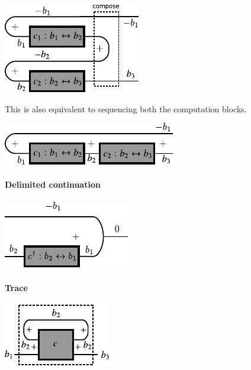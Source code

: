 \documentclass[preprint]{sigplanconf}
\begin{document}
\begin{center}
  \includegraphics{diagrams/compose.pdf}
\end{center}

This is also equivalent to sequencing both the computation blocks. 

\begin{center}
  \includegraphics{diagrams/compose2.pdf}
\end{center}


\paragraph*{Delimited continuation}

\begin{center}
  \includegraphics{diagrams/delimc.pdf}
\end{center}

\paragraph*{Trace }


\begin{center}
  \includegraphics{diagrams/trace.pdf}
\end{center}
\end{document}
